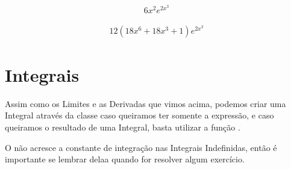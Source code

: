 \documentclass[letterpaper,10pt,english]{jupyterBook}
\begin{document}
\begin{sphinxVerbatim}[commandchars=\\\{\}]
  
\end{sphinxVerbatim}
\begin{equation*}
\begin{split}\displaystyle 6 x^{2} e^{2 x^{3}}\end{split}
\end{equation*}
\begin{sphinxVerbatim}[commandchars=\\\{\}]
 
\end{sphinxVerbatim}
\begin{equation*}
\begin{split}\displaystyle 12 \left(18 x^{6} + 18 x^{3} + 1\right) e^{2 x^{3}}\end{split}
\end{equation*}

\section{Integrais}
\label{\detokenize{chapters/4:integrais}}
\sphinxAtStartPar
Assim como os Limites e as Derivadas que vimos acima, podemos criar uma Integral através da classe  caso queiramos ter somente a expressão, e caso queiramos o resultado de uma Integral, basta utilizar a função .

\sphinxAtStartPar
O  não acresce a constante de integração nas Integrais Indefinidas, então é importante se lembrar delaa quando for resolver algum exercício.
\end{document}
